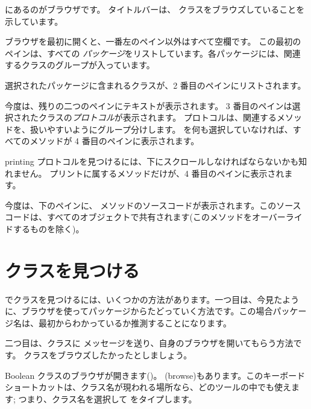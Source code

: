 \documentclass[a4paper,10pt,twoside]{book}
\begin{document}
 にあるのがブラウザです。
タイトルバーは、 クラスをブラウズしていることを示しています。

ブラウザを最初に開くと、一番左のペイン以外はすべて空欄です。
この最初のペインは、すべての \emph{パッケージ}をリストしています。各パッケージには、関連するクラスのグループが入っています。

選択されたパッケージに含まれるクラスが、2 番目のペインにリストされます。

今度は、残りの二つのペインにテキストが表示されます。
3 番目のペインは選択されたクラスの\emph{プロトコル}が表示されます。
プロトコルは、関連するメソッドを、扱いやすいようにグループ分けします。
を何も選択していなければ、すべてのメソッドが 4 番目のペインに表示されます。

printing プロトコルを見つけるには、下にスクロールしなければならないかも知れません。
プリントに属するメソッドだけが、4 番目のペインに表示されます。

今度は、下のペインに、 メソッドのソースコードが表示されます。このソースコードは、すべてのオブジェクトで共有されます(このメソッドをオーバーライドするものを除く)。

\section{クラスを見つける}

\pharo でクラスを見つけるには、いくつかの方法があります。一つ目は、今見たように、ブラウザを使ってパッケージからたどっていく方法です。この場合パッケージ名は、最初からわかっているか推測することになります。

二つ目は、クラスに メッセージを送り、自身のブラウザを開いてもらう方法です。 クラスをブラウズしたかったとしましょう。

Boolean クラスのブラウザが開きます()。
  (browse)もあります。このキーボードショートカットは、クラス名が現われる場所なら、どのツールの中でも使えます;
つまり、クラス名を選択して  をタイプします。
\end{document}
